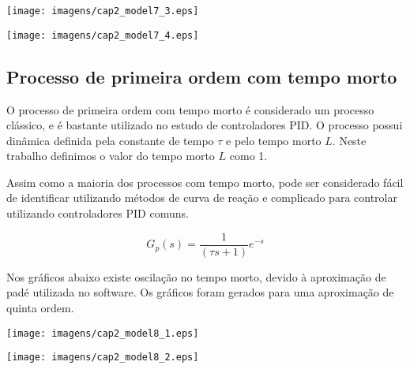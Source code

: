     \begin{center}
        \texttt{[image: imagens/cap2\_model7\_3.eps]}
        \label{cap2_13}
    \end{center}
    
    \begin{center}
        \texttt{[image: imagens/cap2\_model7\_4.eps]}
        \label{cap2_14}
    \end{center}

\subsection{Processo de primeira ordem com tempo morto}

    O processo de primeira ordem com tempo morto é considerado um processo
    clássico, e é bastante utilizado no estudo de controladores \acs{PID}. O
    processo possui dinâmica definida pela constante de tempo $\tau$ e pelo
    tempo morto $L$. Neste trabalho definimos o valor do tempo morto $L$ como 1.
    
    Assim como a maioria dos processos com tempo morto, pode ser considerado
    fácil de identificar utilizando métodos de curva de reação e complicado para
    controlar utilizando controladores \acs{PID} comuns.

    \begin{equation}
        G_p(s) = \frac{1}{(\tau s +1)}e^{-s}
    \end{equation}
    
    Nos gráficos abaixo existe oscilação no tempo morto, devido à aproximação de
    padé utilizada no software. Os gráficos foram gerados para uma aproximação
    de quinta ordem.

    \begin{center}
        \texttt{[image: imagens/cap2\_model8\_1.eps]}
    \end{center}

    \begin{center}
        \texttt{[image: imagens/cap2\_model8\_2.eps]}
    \end{center}
    
